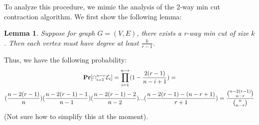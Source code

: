 \documentclass[12pt]{article}%
\newenvironment{proof}[1][Proof]{\textbf{#1.} }{\ \rule{0.5em}{0.5em}}
\newtheorem{lemma}{Lemma}
\begin{document}
To analyze this procedure, we mimic the analysis of the 2-way min cut contraction algorithm. We first show the following lemma:
\begin{lemma}
Suppose for graph $G=(V,E)$, there exists a r-way min cut of size $k$. Then each vertex must have degree at least $\frac{k}{r-1}$.
\end{lemma}
\iffalse
\begin{proof}
  We prove this first for $3$-way cuts. Suppose there exists a vertex $v \in V$ with degree less than $\frac{k}{2}$. As the there exists a 3-way min-cut $C$, let $C_1,C_2,C_3$ denote the components of the graph partitioned by cut $C$. Now $v$ must be contained in one of these three components say $ c \in C_1$. Choose $r \in C_2$ or $r \in C_3$ such that such that $v,e$ are connected by an edge. We can always find such a vertex as the case where the graph is exactly partitioned into $3$ components with no edges in between them is trivial. Now take partitons $C'_1 = \{v\}$ and $C'_2 = C_2$ and $C'_3 = C_1/\{v\} \cup C_3$
  Let $E(C_i,C_j)$ denote the set of edges connecting vertices in components $C_i,C_j$. Then $$|E(C'_1,C'_3)| < \frac{k}{2} - 1, \quad |E(C'_2,C'_3)| \leq \frac{k}{2} - 1, \quad |E(C'_1,C'_2)| = 1$$
  To guarentee the second condition, we can use our $C'2 = \{r\}$ judiciously such that
  This gives us a 3-cut of $k-1$, contradicting the minimality of $C$.
\end{proof}
\fi

Thus, we have the following probability:
\begin{gather*}
{\bf Pr}[\cap_{i=1}^{n-r}\mathcal{E}_i] = \prod_{i=1}^{n-r} (1 - \frac{2(r-1)}{n-i+1}) = \\
(\frac{n-2(r-1)}{n})(\frac{n-2(r-1)-1}{n-1})(\frac{n-2(r-1)-2}{n-2})...(\frac{n-2(r-1)-(n-r+1)}{r+1}) = \frac{\binom{n-2(r-1)}{n-r}}{ \binom{n}{n-r}}
\end{gather*}
(Not sure how to simplify this at the moment).
\end{document}
